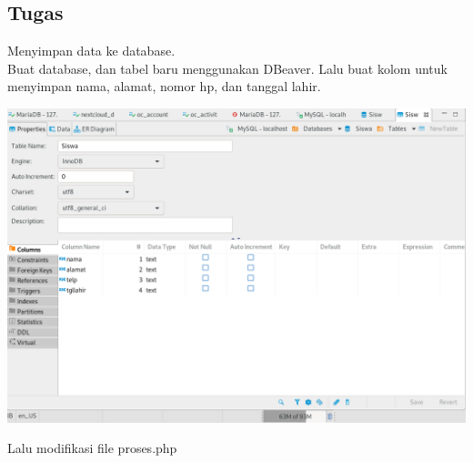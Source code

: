\documentclass[a4paper,12pt]{article}
\begin{document}
\subsection{Tugas}
Menyimpan data ke database.\\
Buat database, dan tabel baru menggunakan DBeaver. Lalu buat kolom untuk menyimpan nama, alamat, nomor hp, dan tanggal lahir.
\begin{center}
    \includegraphics[scale=.4]{6.png} 
\end{center}
Lalu modifikasi file proses.php
\end{document}
